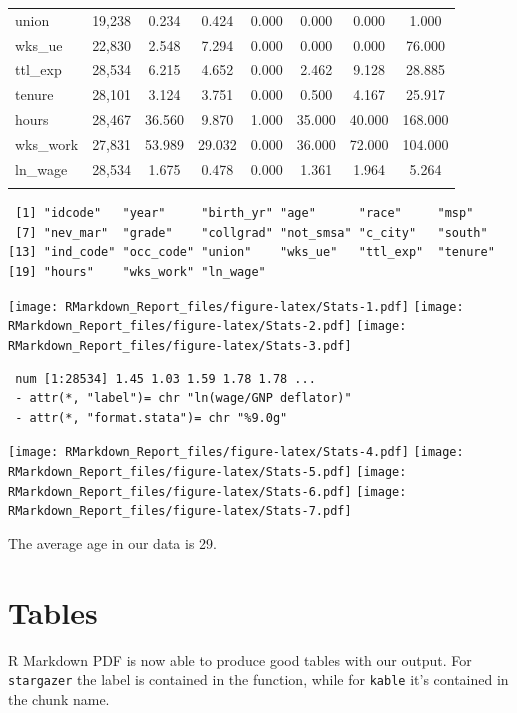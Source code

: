 \documentclass[
  12pt,
]{article}
\begin{document}
\begin{table}[ht]
\begin{tabular}{@{\extracolsep{5pt}}lccccccc}
union & 19,238 & 0.234 & 0.424 & 0.000 & 0.000 & 0.000 & 1.000 \\ 
wks\_ue & 22,830 & 2.548 & 7.294 & 0.000 & 0.000 & 0.000 & 76.000 \\ 
ttl\_exp & 28,534 & 6.215 & 4.652 & 0.000 & 2.462 & 9.128 & 28.885 \\ 
tenure & 28,101 & 3.124 & 3.751 & 0.000 & 0.500 & 4.167 & 25.917 \\ 
hours & 28,467 & 36.560 & 9.870 & 1.000 & 35.000 & 40.000 & 168.000 \\ 
wks\_work & 27,831 & 53.989 & 29.032 & 0.000 & 36.000 & 72.000 & 104.000 \\ 
ln\_wage & 28,534 & 1.675 & 0.478 & 0.000 & 1.361 & 1.964 & 5.264 \\ 
\hline \\[-1.8ex] 
\end{tabular} 
\end{table}

\begin{verbatim}
 [1] "idcode"   "year"     "birth_yr" "age"      "race"     "msp"     
 [7] "nev_mar"  "grade"    "collgrad" "not_smsa" "c_city"   "south"   
[13] "ind_code" "occ_code" "union"    "wks_ue"   "ttl_exp"  "tenure"  
[19] "hours"    "wks_work" "ln_wage" 
\end{verbatim}

\texttt{[image: RMarkdown\_Report\_files/figure-latex/Stats-1.pdf]} \texttt{[image: RMarkdown\_Report\_files/figure-latex/Stats-2.pdf]} \texttt{[image: RMarkdown\_Report\_files/figure-latex/Stats-3.pdf]}

\begin{verbatim}
 num [1:28534] 1.45 1.03 1.59 1.78 1.78 ...
 - attr(*, "label")= chr "ln(wage/GNP deflator)"
 - attr(*, "format.stata")= chr "%9.0g"
\end{verbatim}

\texttt{[image: RMarkdown\_Report\_files/figure-latex/Stats-4.pdf]} \texttt{[image: RMarkdown\_Report\_files/figure-latex/Stats-5.pdf]} \texttt{[image: RMarkdown\_Report\_files/figure-latex/Stats-6.pdf]} \texttt{[image: RMarkdown\_Report\_files/figure-latex/Stats-7.pdf]}

The average age in our data is 29.

\hypertarget{sec:tables}{%
\section{Tables}\label{sec:tables}}

R Markdown PDF is now able to produce good tables with our output. For \texttt{stargazer} the label is contained in the function, while for \texttt{kable} it's contained in the chunk name.
\end{document}
